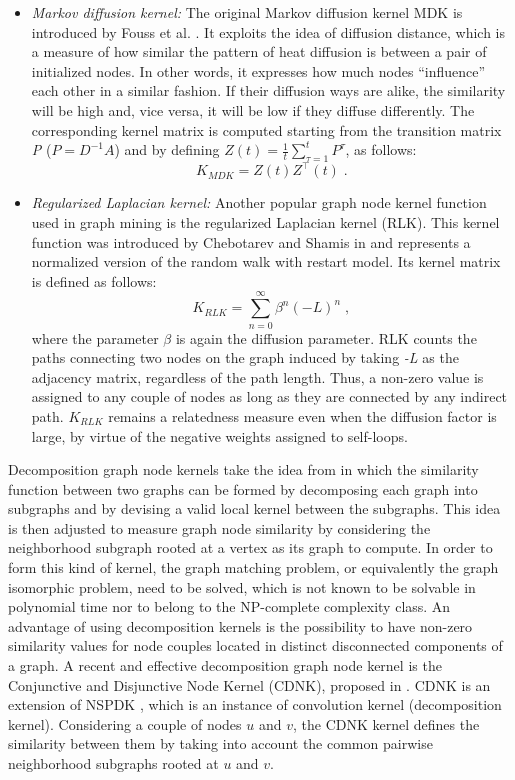 \documentclass[runningheads,a4paper]{llncs}
\begin{document}
\begin{itemize}
\item \textit{Markov diffusion kernel:} The original Markov diffusion kernel MDK is introduced by Fouss et al. \cite{jour3}. It exploits the idea of diffusion distance, which is a measure of how similar the pattern of heat diffusion is between a pair of initialized nodes. In other words, it expresses how much nodes ``influence'' each other in a similar fashion. If their diffusion ways are alike, the similarity will be high and, vice versa, it will be low if they diffuse differently. The corresponding kernel matrix is computed starting from the transition matrix \textit{P} ($P = D^{-1} A$) and by defining $Z(t) = \frac{1}{t}\sum_{\tau=1}^{t} P^{\tau}$, as follows:
\begin{equation}
K_{MDK} = Z(t) Z^{\top}(t)\; .
\end{equation}

\item \textit{Regularized Laplacian kernel:} Another popular graph node kernel function used in graph mining is the regularized Laplacian kernel (RLK). This kernel function was introduced by Chebotarev and Shamis in \cite{proceeding4} and represents a normalized version of the random walk with restart model. Its kernel matrix is defined as follows:
\begin{equation}
K_{RLK} = \sum_{n=0}^{\infty}\beta^{n}(-L)^n\; ,
\end{equation}
where the parameter $\beta$ is again the diffusion parameter. RLK counts the paths connecting two nodes on the graph induced by taking \textit{-L} as the adjacency matrix, regardless of the path length. Thus, a non-zero value is assigned to any couple of nodes as long as they are connected by any indirect path. $K_{RLK}$ remains a relatedness measure even when the diffusion factor is large, by virtue of the negative weights assigned to self-loops.
\end{itemize}
Decomposition graph node kernels take the idea from \cite{proceeding5} in which the similarity function between two graphs can be formed by decomposing each graph into subgraphs and by devising a valid local kernel between the subgraphs. This idea is then adjusted to measure graph node similarity by considering the neighborhood subgraph rooted at a vertex as its graph to compute. In order to form this kind of kernel,  the graph matching problem, or equivalently the graph isomorphic problem, need to be solved, which is not known to be solvable in polynomial time nor to belong to the NP-complete complexity class. An advantage of using decomposition kernels is the possibility to have non-zero similarity values for node couples located in distinct disconnected components of a graph. A recent and effective decomposition graph node kernel is the Conjunctive and Disjunctive Node Kernel (CDNK), proposed in \cite{proceeding6}. CDNK is an extension of NSPDK \cite{proceeding7}, which is an instance of convolution kernel (decomposition kernel). Considering a couple of nodes $u$ and $v$, the CDNK kernel defines the similarity between them by taking into account the common pairwise neighborhood subgraphs rooted at $u$ and $v$.
\end{document}
